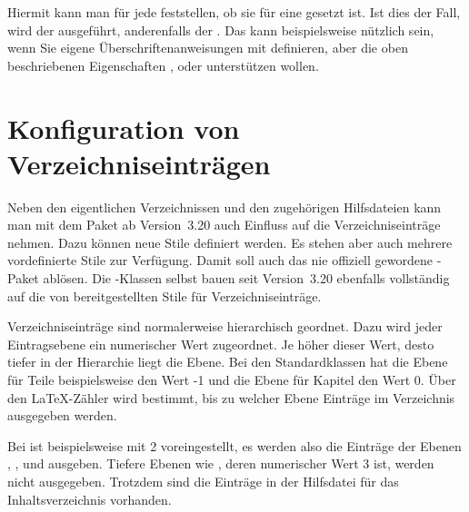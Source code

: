 \begin{Declaration}
\end{Declaration}
Hiermit kann man für jede
 feststellen, ob sie für eine 
gesetzt ist. Ist dies der Fall, wird der  ausgeführt,
anderenfalls der . Das kann beispielsweise nützlich sein,
wenn Sie eigene Überschriftenanweisungen mit
 definieren, aber die oben beschriebenen
Eigenschaften ,  oder 
unterstützen wollen.
%
\EndIndexGroup


\section{Konfiguration von Verzeichniseinträgen}
\BeginIndexGroup
{}

Neben den eigentlichen
Verzeichnissen und den zugehörigen Hilfsdateien kann man mit dem Paket
 ab Version~3.20 auch Einfluss auf die Verzeichniseinträge
nehmen. Dazu können neue Stile definiert werden. Es stehen aber auch mehrere
vordefinierte Stile zur Verfügung. Damit soll  auch das
nie offiziell gewordene \KOMAScript-Paket  ablösen. Die
\KOMAScript-Klassen selbst bauen seit Version~3.20 ebenfalls vollständig auf
die von  bereitgestellten Stile für Verzeichniseinträge.

\begin{Declaration}
\end{Declaration}
Verzeichniseinträge sind normalerweise hierarchisch geordnet. Dazu wird jeder
Eintragsebene ein numerischer Wert zugeordnet. Je höher dieser Wert, desto
tiefer in der Hierarchie liegt die Ebene. Bei den Standardklassen hat die
Ebene für Teile beispielsweise den Wert -1 und die Ebene für Kapitel den Wert
0. Über den \LaTeX-Zähler  wird bestimmt, bis zu welcher
Ebene Einträge im Verzeichnis ausgegeben werden.

Bei  ist  beispielsweise mit 2 voreingestellt,
es werden also die Einträge der Ebenen , ,
 und  ausgeben. Tiefere Ebenen wie
, deren numerischer Wert 3 ist, werden nicht
ausgegeben. Trotzdem sind die Einträge in der Hilfsdatei für das
Inhaltsverzeichnis vorhanden.

